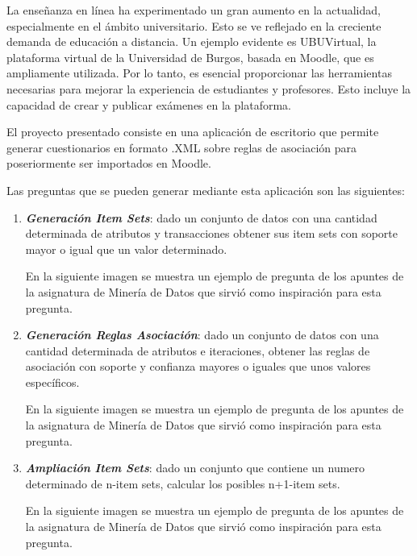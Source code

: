 
La enseñanza en línea ha experimentado un gran aumento en la actualidad, especialmente en el ámbito universitario. Esto se ve reflejado en la creciente demanda de educación a distancia. Un ejemplo evidente es UBUVirtual, la plataforma virtual de la Universidad de Burgos, basada en Moodle, que es ampliamente utilizada. Por lo tanto, es esencial proporcionar las herramientas necesarias para mejorar la experiencia de estudiantes y profesores. Esto incluye la capacidad de crear y publicar exámenes en la plataforma. 

El proyecto presentado consiste en una aplicación de escritorio que permite generar cuestionarios en formato .XML sobre reglas de asociación para poseriormente ser importados en Moodle.

Las preguntas que se pueden generar mediante esta aplicación son las siguientes:

\begin{enumerate}
    \item \textbf{\textit{Generación Item Sets}}: dado un conjunto de datos con una cantidad determinada de atributos y transacciones obtener sus item sets con soporte mayor o igual que un valor determinado.

    En la siguiente imagen se muestra un ejemplo de pregunta de los apuntes de la asignatura de Minería de Datos que sirvió como inspiración para esta pregunta.
    
    
    \item \textbf{\textit{Generación Reglas Asociación}}: dado un conjunto de datos con una cantidad determinada de atributos e iteraciones, obtener las reglas de asociación con soporte y confianza mayores o iguales que unos valores específicos.
    
    En la siguiente imagen se muestra un ejemplo de pregunta de los apuntes de la asignatura de Minería de Datos que sirvió como inspiración para esta pregunta.
        
    
    \item \textbf{\textit{Ampliación Item Sets}}: dado un conjunto que contiene un numero determinado de n-item sets, calcular los posibles n+1-item sets.
    
    En la siguiente imagen se muestra un ejemplo de pregunta de los apuntes de la asignatura de Minería de Datos que sirvió como inspiración para esta pregunta.
        
\end{enumerate}
